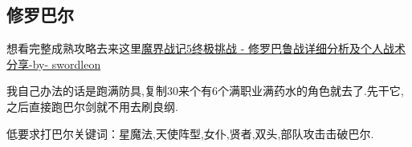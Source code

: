	\subsection{修罗巴尔}
	想看完整成熟攻略去来这里\href{http://tieba.baidu.com/p/3949061316}{魔界战记5终极挑战 - 修罗巴鲁战详细分析及个人战术分享-by- swordleon }

	我自己办法的话是跑满防具,复制30来个有6个满职业满药水的角色就去了.先干它,之后直接跑巴尔剑就不用去刷良纲.

	低要求打巴尔关键词：星魔法,天使阵型,女仆,贤者,双头,部队攻击击破巴尔.




